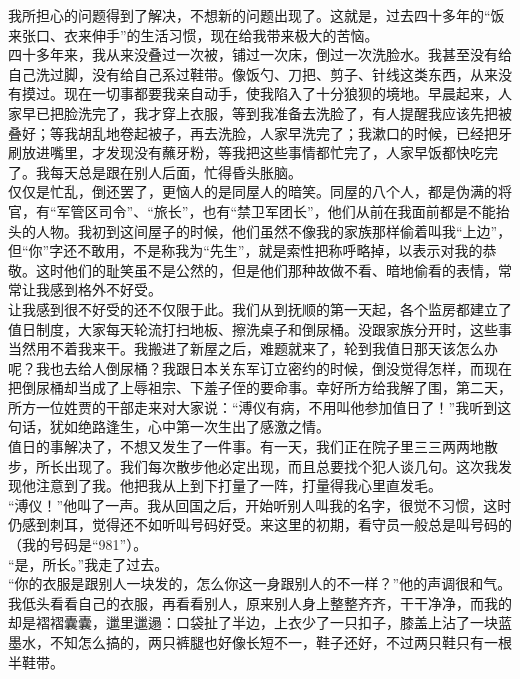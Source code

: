 我所担心的问题得到了解决，不想新的问题出现了。这就是，过去四十多年的“饭来张口、衣来伸手”的生活习惯，现在给我带来极大的苦恼。\\

四十多年来，我从来没叠过一次被，铺过一次床，倒过一次洗脸水。我甚至没有给自己洗过脚，没有给自己系过鞋带。像饭勺、刀把、剪子、针线这类东西，从来没有摸过。现在一切事都要我亲自动手，使我陷入了十分狼狈的境地。早晨起来，人家早已把脸洗完了，我才穿上衣服，等到我准备去洗脸了，有人提醒我应该先把被叠好；等我胡乱地卷起被子，再去洗脸，人家早洗完了；我漱口的时候，已经把牙刷放进嘴里，才发现没有蘸牙粉，等我把这些事情都忙完了，人家早饭都快吃完了。我每天总是跟在别人后面，忙得昏头胀脑。\\

仅仅是忙乱，倒还罢了，更恼人的是同屋人的暗笑。同屋的八个人，都是伪满的将官，有“军管区司令”、“旅长”，也有“禁卫军团长”，他们从前在我面前都是不能抬头的人物。我初到这间屋子的时候，他们虽然不像我的家族那样偷着叫我“上边”，但“你”字还不敢用，不是称我为“先生”，就是索性把称呼略掉，以表示对我的恭敬。这时他们的耻笑虽不是公然的，但是他们那种故做不看、暗地偷看的表情，常常让我感到格外不好受。\\

让我感到很不好受的还不仅限于此。我们从到抚顺的第一天起，各个监房都建立了值日制度，大家每天轮流打扫地板、擦洗桌子和倒尿桶。没跟家族分开时，这些事当然用不着我来干。我搬进了新屋之后，难题就来了，轮到我值日那天该怎么办呢？我也去给人倒尿桶？我跟日本关东军订立密约的时候，倒没觉得怎样，而现在把倒尿桶却当成了上辱祖宗、下羞子侄的要命事。幸好所方给我解了围，第二天，所方一位姓贾的干部走来对大家说：“溥仪有病，不用叫他参加值日了！”我听到这句话，犹如绝路逢生，心中第一次生出了感激之情。\\

值日的事解决了，不想又发生了一件事。有一天，我们正在院子里三三两两地散步，所长出现了。我们每次散步他必定出现，而且总要找个犯人谈几句。这次我发现他注意到了我。他把我从上到下打量了一阵，打量得我心里直发毛。\\

“溥仪！”他叫了一声。我从回国之后，开始听别人叫我的名字，很觉不习惯，这时仍感到刺耳，觉得还不如听叫号码好受。来这里的初期，看守员一般总是叫号码的（我的号码是“981”）。\\

“是，所长。”我走了过去。\\

“你的衣服是跟别人一块发的，怎么你这一身跟别人的不一样？”他的声调很和气。\\

我低头看看自己的衣服，再看看别人，原来别人身上整整齐齐，干干净净，而我的却是褶褶囊囊，邋里邋遢：口袋扯了半边，上衣少了一只扣子，膝盖上沾了一块蓝墨水，不知怎么搞的，两只裤腿也好像长短不一，鞋子还好，不过两只鞋只有一根半鞋带。\\

